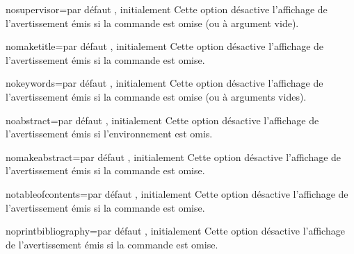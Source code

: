 \begin{docKey}{nosupervisor}{=\textbar{}}{par défaut ,
    initialement }
  Cette option désactive l'affichage de l'avertissement émis si la commande
   est omise (ou à argument vide).
\end{docKey}
\begin{docKey}{nomaketitle}{=\textbar{}}{par défaut ,
    initialement }
  Cette option désactive l'affichage de l'avertissement émis si la commande
   est omise.
\end{docKey}
\begin{docKey}{nokeywords}{=\textbar{}}{par défaut ,
    initialement }
  Cette option désactive l'affichage de l'avertissement émis si la commande
   est omise (ou à arguments vides).
\end{docKey}
\begin{docKey}{noabstract}{=\textbar{}}{par défaut ,
    initialement }
  Cette option désactive l'affichage de l'avertissement émis si l'environnement
   est omis.
\end{docKey}
\begin{docKey}{nomakeabstract}{=\textbar{}}{par défaut ,
    initialement }
  Cette option désactive l'affichage de l'avertissement émis si la commande
   est omise.
\end{docKey}
\begin{docKey}{notableofcontents}{=\textbar{}}{par défaut ,
    initialement }
  Cette option désactive l'affichage de l'avertissement émis si la commande
   est omise.
\end{docKey}
\begin{docKey}{noprintbibliography}{=\textbar{}}{par défaut ,
    initialement }
  Cette option désactive l'affichage de l'avertissement émis si la commande
   est omise.
\end{docKey}

%
\iffalse
\fi
